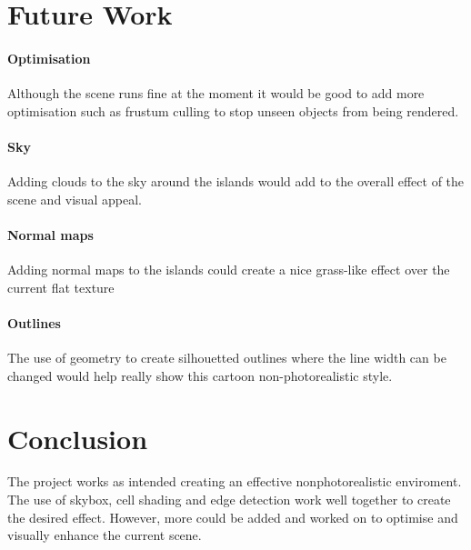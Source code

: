 \documentclass[10pt, a4paper]{article}
\begin{document}
	\section{Future Work}
	\paragraph{Optimisation}
	Although the scene runs fine at the moment it would be good to add more optimisation such as frustum culling to stop unseen objects from being rendered.
	\paragraph{Sky}
	Adding clouds to the sky around the islands would
	add to the overall effect of the scene and visual appeal.
	\paragraph{Normal maps}
	Adding normal maps to the islands could create a nice grass-like effect over the current flat texture
	\paragraph{Outlines}
	The use of geometry to create silhouetted outlines where the line width can be changed would help really show this cartoon non-photorealistic style.
	
\section{Conclusion}	

The project works as intended creating an effective nonphotorealistic
enviroment. The use of skybox, cell shading and edge detection work well together to create the desired effect. However, more could be added and
worked on to optimise and visually enhance the current scene.




		
\end{document}

